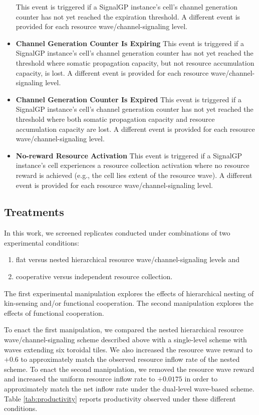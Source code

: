 \begin{itemize}
This event is triggered if a SignalGP instance's cell's channel generation counter has not yet reached the expiration threshold.
A different event is provided for each resource wave/channel-signaling level.
\item \textbf{Channel Generation Counter Is Expiring}
This event is triggered if a SignalGP instance's cell's channel generation counter has not yet reached the threshold where somatic propagation capacity, but not resource accumulation capacity, is lost.
A different event is provided for each resource wave/channel-signaling level.
\item \textbf{Channel Generation Counter Is Expired}
This event is triggered if a SignalGP instance's cell's channel generation counter has not yet reached the threshold where both somatic propagation capacity and resource accumulation capacity are lost.
A different event is provided for each resource wave/channel-signaling level.
\item \textbf{No-reward Resource Activation}
This event is triggered if a SignalGP instance's cell experiences a resource collection activation where no resource reward is achieved (e.g., the cell lies extent of the resource wave).
A different event is provided for each resource wave/channel-signaling level.
\end{itemize}

\subsection{Treatments} \label{sup:treatments}





In this work, we screened replicates conducted under combinations of two experimental conditions:
\begin{enumerate}
\item flat versus nested hierarchical resource wave/channel-signaling levels and
\item cooperative versus independent resource collection.
\end{enumerate}

The first experimental manipulation explores the effects of hierarchical nesting of kin-sensing and/or functional cooperation.
The second manipulation explores the effects of functional cooperation.

To enact the first manipulation, we compared the nested hierarchical resource wave/channel-signaling scheme described above with a single-level scheme with waves extending six toroidal tiles.
We also increased the resource wave reward to $+0.6$ to approximately match the observed resource inflow rate of the nested scheme.
To enact the second manipulation, we removed the resource wave reward and increased the uniform resource inflow rate to $+0.0175$ in order to approximately match the net inflow rate under the dual-level wave-based scheme.
Table \ref{tab:productivity} reports productivity observed under these different conditions.

